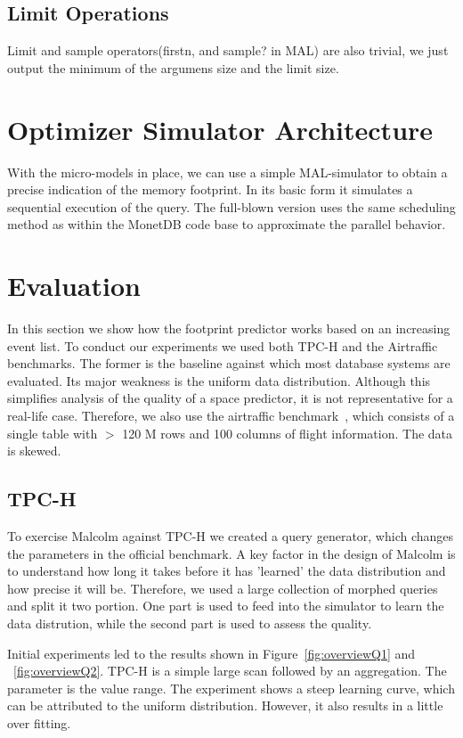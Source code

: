 \documentclass[conference]{IEEEtran}
\begin{document}
\subsection{Limit Operations}
Limit and sample operators(firstn, and sample? in MAL) are also trivial,
we just output the minimum of the argumens size and the limit size.

\section{Optimizer Simulator Architecture}
With the micro-models in place, we can use a simple MAL-simulator to obtain a precise indication of the memory footprint. In its basic form it simulates a sequential execution of the query. The full-blown version uses the same scheduling method as within the MonetDB code base to approximate the parallel behavior.

\section{Evaluation}
In this section we show how the footprint predictor works based on an increasing event list.
To conduct our experiments we used both TPC-H and the Airtraffic benchmarks. The former is
the baseline against which most database systems are evaluated. Its major weakness is the
uniform data distribution. Although this simplifies analysis of the quality of a space
predictor, it is not representative for a real-life case. Therefore, we also use the airtraffic
benchmark~\cite{airtraffic}, which consists of a single table with $>$ 120 M rows and 100 columns of flight information. The data is skewed.


\subsection{TPC-H}
To exercise Malcolm against TPC-H we created a query generator, which changes the parameters in the official benchmark. A key factor in the design of Malcolm is to understand how long it
takes before it has 'learned' the data distribution and how precise it will be. Therefore, we
used a large collection of morphed queries and split it two portion. One part is used to
feed into the simulator to learn the data distrution, while the second part is used to assess
the quality.

Initial experiments led to the results shown in Figure~\ref{fig:overviewQ1} and ~\ref{fig:overviewQ2}. TPC-H is a simple large scan followed by an aggregation. 
The parameter is the value range. The experiment shows a steep learning curve, which can be
attributed to the uniform distribution. However, it also results in a little over fitting.
\end{document}
